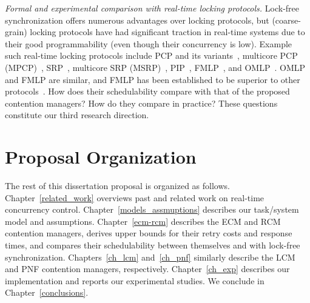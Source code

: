 \textit{Formal and experimental comparison with real-time locking protocols.} Lock-free synchronization offers numerous advantages over locking protocols, but (coarse-grain) locking protocols have had significant traction in real-time systems due to their good programmability (even though their concurrency is low).  Example such real-time locking protocols include PCP and its variants~\cite{chen1990dynamic,6031129,Rajkumar:1991:SRS:532621,sha1990priority}, multicore PCP (MPCP)~\cite{lakshmanan2009coordinated,rajkumar2002real}, SRP~\cite{Buttazzo:2004:HRC:1027504, baker1991stack}, multicore SRP (MSRP)~\cite{gai2003comparison}, PIP~\cite{easwaran2009resource}, FMLP~\cite{key-4,brandenburg2008implementation,holman2006locking}, and OMLP~\cite{Baruah:2007:TMG:1338441.1338647}. OMLP and FMLP are similar, and FMLP has been established to be superior to other protocols~\cite{brandenburg2008comparison}. How does their schedulability compare with that of the proposed contention managers? How do they compare in practice? These questions constitute our third research direction. 

\section{\label{sec:proposal outline}Proposal Organization}

The rest of this dissertation proposal is organized as follows. Chapter~\ref{related_work} overviews past and related work on  real-time concurrency control. Chapter~\ref{models_assmuptions} describes our task/system model and assumptions.   Chapter~\ref{ecm-rcm} describes the ECM and RCM contention managers, derives upper bounds for their retry costs and response times, and compares their schedulability between themselves and with lock-free synchronization. Chapters~\ref{ch_lcm} and~\ref{ch_pnf} similarly describe the LCM and PNF contention managers, respectively. Chapter~\ref{ch_exp} describes our implementation and reports our experimental studies. We conclude in Chapter~\ref{conclusions}.